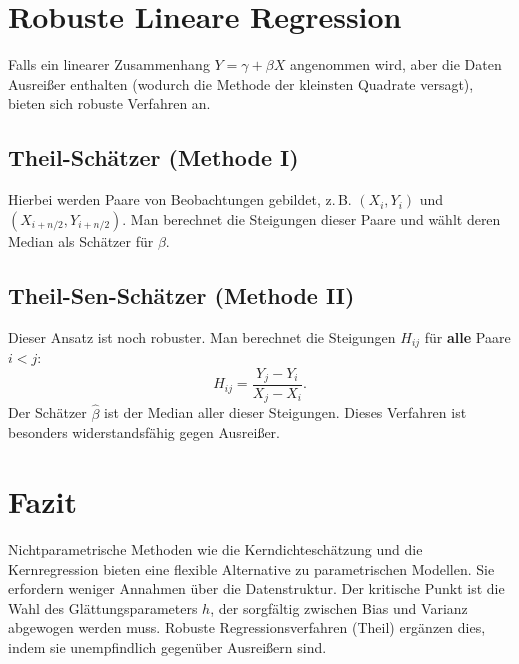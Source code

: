 \documentclass[a4paper,12pt]{article}
\begin{document}
\section{Robuste Lineare Regression}
Falls ein linearer Zusammenhang $Y = \gamma + \beta X$ angenommen wird, aber die Daten Ausreißer enthalten (wodurch die Methode der kleinsten Quadrate versagt), bieten sich robuste Verfahren an.

\subsection{Theil-Schätzer (Methode I)}
Hierbei werden Paare von Beobachtungen gebildet, z.\,B. $(X_i, Y_i)$ und $(X_{i+n/2}, Y_{i+n/2})$. Man berechnet die Steigungen dieser Paare und wählt deren Median als Schätzer für $\beta$.

\subsection{Theil-Sen-Schätzer (Methode II)}
Dieser Ansatz ist noch robuster. Man berechnet die Steigungen $H_{ij}$ für \textbf{alle} Paare $i < j$:
\begin{equation}
    H_{ij} = \frac{Y_j - Y_i}{X_j - X_i}.
\end{equation}
Der Schätzer $\hat{\beta}$ ist der Median aller dieser Steigungen. Dieses Verfahren ist besonders widerstandsfähig gegen Ausreißer.

\section{Fazit}
Nichtparametrische Methoden wie die Kerndichteschätzung und die Kernregression bieten eine flexible Alternative zu parametrischen Modellen. Sie erfordern weniger Annahmen über die Datenstruktur. Der kritische Punkt ist die Wahl des Glättungsparameters $h$, der sorgfältig zwischen Bias und Varianz abgewogen werden muss. Robuste Regressionsverfahren (Theil) ergänzen dies, indem sie unempfindlich gegenüber Ausreißern sind.
\end{document}
